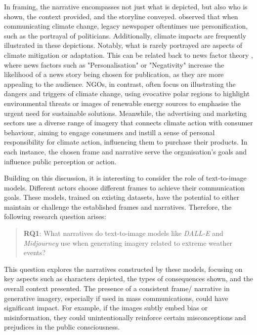 In framing, the narrative encompasses not just what is depicted, but also who is shown, the context provided, and the storyline conveyed. \textcite{ONeill2014} observed that when communicating climate change, legacy newspaper oftentimes use personification, such as the portrayal of politicians. Additionally, climate impacts are frequently illustrated in these depictions. Notably, what is rarely portrayed are aspects of climate mitigation or adaptation. This can be related back to news factor theory \parencite{Galtung1965}, where news factors such as "Personalisation" or "Negativity" increase the likelihood of a news story being chosen for publication, as they are more appealing to the audience. NGOs, in contrast, often focus on illustrating the dangers and triggers of climate change, using evocative polar regions to highlight environmental threats or images of renewable energy sources to emphasise the urgent need for sustainable solutions. Meanwhile, the advertising and marketing sectors use a diverse range of imagery that connects climate action with consumer behaviour, aiming to engage consumers and instill a sense of personal responsibility for climate action, influencing them to purchase their products. In each instance, the chosen frame and narrative serve the organisation's goals and influence public perception or action.

Building on this discussion, it is interesting to consider the role of text-to-image models. Different actors choose different frames to achieve their communication goals. These models, trained on existing datasets, have the potential to either maintain or challenge the established frames and narratives. Therefore, the following research question arises:

\begin{quote}
\textbf{RQ1}: What narratives do text-to-image models like \textit{DALL-E} and \textit{Midjourney} use when generating imagery related to extreme weather events? 
\end{quote}

This question explores the narratives constructed by these models, focusing on key aspects such as characters depicted, the types of consequences shown, and the overall context presented. The presence of a consistent frame/ narrative in generative imagery, especially if used in mass communications, could have significant impact. For example, if the images subtly embed bias or misinformation, they could unintentionally reinforce certain misconceptions and prejudices in the public consciousness.

